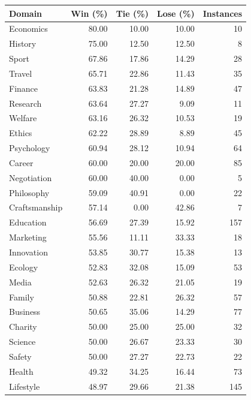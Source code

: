 \begin{table}[t]
    \footnotesize
    \centering
    \begin{tabular}{l rrrr}
        \toprule
        \textbf{Domain} & \textbf{Win (\%)} & \textbf{Tie (\%)} & \textbf{Lose (\%)} & \textbf{Instances} \\
        \midrule
        Economics & 80.00 & 10.00 & 10.00 & 10 \\ 
        History & 75.00 & 12.50 & 12.50 & 8 \\ 
        Sport & 67.86 & 17.86 & 14.29 & 28 \\ 
        Travel & 65.71 & 22.86 & 11.43 & 35 \\ 
        Finance & 63.83 & 21.28 & 14.89 & 47 \\ 
        Research & 63.64 & 27.27 & 9.09 & 11 \\ 
        Welfare & 63.16 & 26.32 & 10.53 & 19 \\ 
        Ethics & 62.22 & 28.89 & 8.89 & 45 \\ 
        Psychology & 60.94 & 28.12 & 10.94 & 64 \\ 
        Career & 60.00 & 20.00 & 20.00 & 85 \\ 
        Negotiation & 60.00 & 40.00 & 0.00 & 5 \\ 
        Philosophy & 59.09 & 40.91 & 0.00 & 22 \\ 
        Craftsmanship & 57.14 & 0.00 & 42.86 & 7 \\ 
        Education & 56.69 & 27.39 & 15.92 & 157 \\ 
        Marketing & 55.56 & 11.11 & 33.33 & 18 \\ 
        Innovation & 53.85 & 30.77 & 15.38 & 13 \\ 
        Ecology & 52.83 & 32.08 & 15.09 & 53 \\ 
        Media & 52.63 & 26.32 & 21.05 & 19 \\ 
        Family & 50.88 & 22.81 & 26.32 & 57 \\ 
        Business & 50.65 & 35.06 & 14.29 & 77 \\ 
        Charity & 50.00 & 25.00 & 25.00 & 32 \\ 
        Science & 50.00 & 26.67 & 23.33 & 30 \\ 
        Safety & 50.00 & 27.27 & 22.73 & 22 \\ 
        Health & 49.32 & 34.25 & 16.44 & 73 \\ 
        Lifestyle & 48.97 & 29.66 & 21.38 & 145 \\ 

\end{tabular}
\end{table}

